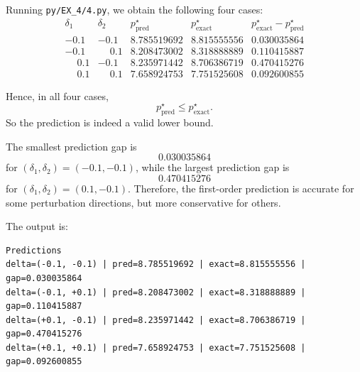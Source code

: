 \documentclass[11pt,letter,notitlepage]{article}
\theoremstyle{definition}
\begin{document}
\begin{solution}
\begin{enumerate}[label=(\alph*)]
Running \texttt{py/EX\_4/4.py}, we obtain the following four cases:
\[
\begin{array}{c|c|c|c|c}
\delta_1 & \delta_2 & p^\star_{\mathrm{pred}} & p^\star_{\mathrm{exact}} &
p^\star_{\mathrm{exact}}-p^\star_{\mathrm{pred}}\\
\hline
-0.1 & -0.1 & 8.785519692 & 8.815555556 & 0.030035864\\
-0.1 & \phantom{-}0.1 & 8.208473002 & 8.318888889 & 0.110415887\\
\phantom{-}0.1 & -0.1 & 8.235971442 & 8.706386719 & 0.470415276\\
\phantom{-}0.1 & \phantom{-}0.1 & 7.658924753 & 7.751525608 & 0.092600855
\end{array}
\]

Hence, in all four cases,
\[
p^\star_{\mathrm{pred}} \le p^\star_{\mathrm{exact}}.
\]
So the prediction is indeed a valid lower bound.

The smallest prediction gap is
\[
0.030035864
\]
for \((\delta_1,\delta_2)=(-0.1,-0.1)\), while the largest prediction gap is
\[
0.470415276
\]
for \((\delta_1,\delta_2)=(0.1,-0.1)\). Therefore, the first-order prediction
is accurate for some perturbation directions, but more conservative for others.

The output is:
\begin{lstlisting}
Predictions
delta=(-0.1, -0.1) | pred=8.785519692 | exact=8.815555556 | gap=0.030035864
delta=(-0.1, +0.1) | pred=8.208473002 | exact=8.318888889 | gap=0.110415887
delta=(+0.1, -0.1) | pred=8.235971442 | exact=8.706386719 | gap=0.470415276
delta=(+0.1, +0.1) | pred=7.658924753 | exact=7.751525608 | gap=0.092600855
\end{lstlisting}

\end{enumerate}
\end{solution}
\end{document}

